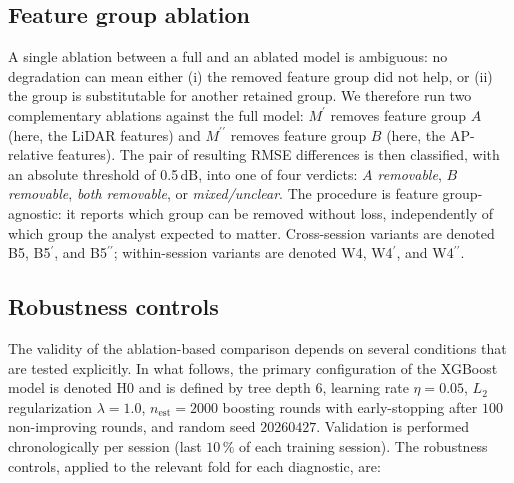 \documentclass[conference]{IEEEtran}
\begin{document}
\subsection{Feature group ablation}
\label{sec:method-disamb}
A single ablation between a full and an ablated model is ambiguous: no degradation can mean either (i) the removed feature group did not help, or (ii) the group is substitutable for another retained group. We therefore run two complementary ablations against the full model: $M^\prime$ removes feature group $A$ (here, the LiDAR features) and $M^{\prime\prime}$ removes feature group $B$ (here, the AP-relative features). The pair of resulting RMSE differences is then classified, with an absolute threshold of 0.5\,dB, into one of four verdicts: \textit{$A$ removable}, \textit{$B$ removable}, \textit{both removable}, or \textit{mixed/unclear}. The procedure is feature group-agnostic: it reports which group can be removed without loss, independently of which group the analyst expected to matter. Cross-session variants are denoted B5, B5$^\prime$, and B5$^{\prime\prime}$; within-session variants are denoted W4, W4$^\prime$, and W4$^{\prime\prime}$.

\subsection{Robustness controls}
\label{sec:method-controls}
The validity of the ablation-based comparison depends on several conditions that are tested explicitly. In what follows, the primary configuration of the XGBoost model is denoted H0 and is defined by tree depth $6$, learning rate $\eta = 0.05$, $L_2$ regularization $\lambda = 1.0$, $n_\text{est} = 2000$ boosting rounds with early-stopping after $100$ non-improving rounds, and random seed $20260427$. Validation is performed chronologically per session (last $10\,\%$ of each training session). The robustness controls, applied to the relevant fold for each diagnostic, are:
\end{document}
